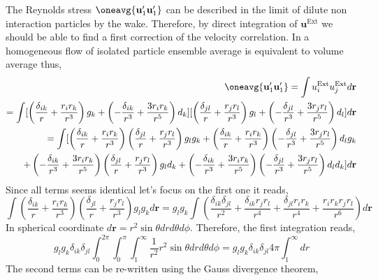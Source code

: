 The Reynolds stress $\oneavg{\textbf{u}_1'\textbf{u}_1'}$ can be described in the limit of dilute non interaction particles by the wake. 
Therefore, by direct integration of $\textbf{u}^\text{Ext}$ we should be able to find a first correction of the velocity correlation. 
In a homogeneous flow of isolated particle ensemble average is equivalent to volume average thus, 
\begin{align*}
    \oneavg{\textbf{u}_1' \textbf{u}_1' }
    = \int u_i^\text{Ext} u_j^\text{Ext} d\textbf{r}\\
    = \int [\left(\frac{\delta_{ik}}{r} + \frac{r_ir_k}{r^3}\right)  g_k
    + \left(-\frac{\delta_{ik}}{r^3} + \frac{3r_ir_k}{r^5}\right)  d_k]
    [ \left(\frac{\delta_{jl}}{r} + \frac{r_jr_l}{r^3}\right)  g_l
    + \left(-\frac{\delta_{jl}}{r^3} + \frac{3r_jr_l}{r^5}\right)  d_l] d\textbf{r}\\
    = \int [\left(\frac{\delta_{ik}}{r} + \frac{r_ir_k}{r^3}\right)
    \left(\frac{\delta_{jl}}{r} + \frac{r_jr_l}{r^3}\right)  g_l  g_k
    + \left(\frac{\delta_{ik}}{r} + \frac{r_ir_k}{r^3}\right) \left(-\frac{\delta_{jl}}{r^3} + \frac{3r_jr_l}{r^5}\right)  d_l g_k\\
    + \left(-\frac{\delta_{ik}}{r^3} + \frac{3r_ir_k}{r^5}\right) \left(\frac{\delta_{jl}}{r} + \frac{r_jr_l}{r^3}\right)  g_l d_k
    + \left(-\frac{\delta_{ik}}{r^3} + \frac{3r_ir_k}{r^5}\right) \left(-\frac{\delta_{jl}}{r^3} + \frac{3r_jr_l}{r^5}\right)  d_l d_k]
    d\textbf{r}\\
\end{align*}
Since all terms seems identical let's focus on the first one it reads, 
\begin{equation*}
    \int \left(\frac{\delta_{ik}}{r} + \frac{r_ir_k}{r^3}\right)
    \left(\frac{\delta_{jl}}{r} + \frac{r_jr_l}{r^3}\right)  g_l  g_kd\textbf{r}
    = 
    g_l  g_k
    \int \left(
    \frac{\delta_{ik}\delta_{jl}}{r^2} 
    + \frac{\delta_{ik} r_jr_l}{r^4} 
    + \frac{\delta_{jl} r_ir_k}{r^4} 
    + \frac{r_ir_kr_jr_l}{r^6} 
    \right)d\textbf{r}
\end{equation*}
In spherical coordinate $d\textbf{r} = r^2 \sin\theta dr d\theta d\phi$. 
Therefore, the first integration reads, 
\begin{equation*}
    g_l  g_k\delta_{ik}\delta_{jl}
    \int_0^{2\pi} 
    \int_0^{\pi} 
    \int_1^{\infty} 
    \frac{1}{r^2} 
    r^2 \sin\theta dr d\theta d\phi
    = g_l  g_k\delta_{ik}\delta_{jl}
    4\pi 
    \int_1^\infty dr
\end{equation*}
The second terms can be re-written using the Gauss divergence theorem, 
